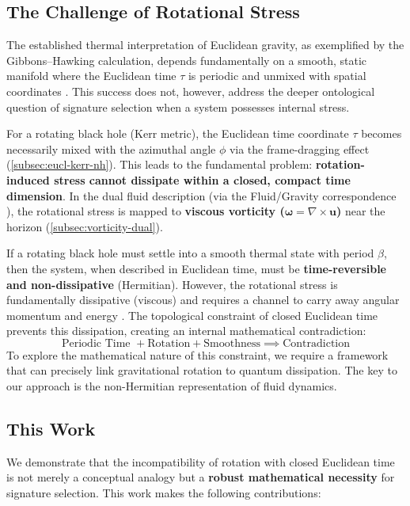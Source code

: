 \documentclass[11pt]{article}
\begin{document}
\subsection{The Challenge of Rotational Stress}

The established thermal interpretation of Euclidean gravity, as exemplified by the Gibbons--Hawking calculation, depends fundamentally on a smooth, static manifold where the Euclidean time $\tau$ is periodic and unmixed with spatial coordinates \cite{GibbonsHawking1977}.
This success does not, however, address the deeper ontological question of signature selection when a system possesses internal stress.

For a rotating black hole (Kerr metric\cite{Kerr1963}), the Euclidean time coordinate $\tau$ becomes necessarily mixed with the azimuthal angle $\phi$ via the frame-dragging effect (\autoref{subsec:eucl-kerr-nh}). This leads to the fundamental problem: \textbf{rotation-induced stress cannot dissipate within a closed, compact time dimension}. In the dual fluid description (via the Fluid/Gravity correspondence \cite{FluidGravity2005}), the rotational stress is mapped to \textbf{viscous vorticity ($\mathbf{\omega} = \nabla \times \mathbf{u}$)} near the horizon (\autoref{subsec:vorticity-dual}).

If a rotating black hole must settle into a smooth thermal state with period $\beta$, then the system, when described in Euclidean time, must be \textbf{time-reversible and non-dissipative} (Hermitian). However, the rotational stress is fundamentally dissipative (viscous) and requires a channel to carry away angular momentum and energy \cite{Hawking1975}. The topological constraint of closed Euclidean time prevents this dissipation, creating an internal mathematical contradiction:
\[
    \text{Periodic Time } + \text{Rotation} + \text{Smoothness} \implies \text{Contradiction}
\]
To explore the mathematical nature of this constraint, we require a framework that can precisely link gravitational rotation to quantum dissipation. The key to our approach is the non-Hermitian representation of fluid dynamics.

\subsection{This Work}

We demonstrate that the incompatibility of rotation with closed Euclidean time is not merely a conceptual analogy but a \textbf{robust mathematical necessity} for signature selection. This work makes the following contributions:
\end{document}

